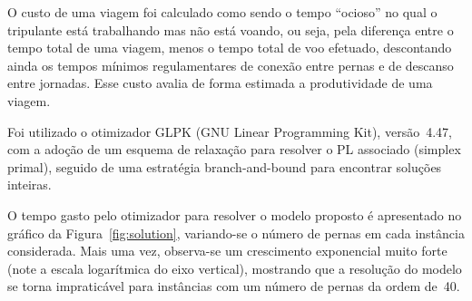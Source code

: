 \documentclass[12pt,a4paper]{article}
\begin{document}
O custo de uma viagem foi calculado como sendo o tempo ``ocioso'' no qual o tripulante está 
trabalhando mas não está voando, ou seja, pela diferença entre o tempo total de uma viagem, menos o 
tempo total de voo efetuado, descontando ainda os tempos mínimos regulamentares de conexão entre 
pernas e de descanso entre jornadas. Esse custo avalia de forma estimada a produtividade de uma 
viagem.

Foi utilizado o otimizador GLPK (GNU Linear Programming Kit), versão~4.47, com a adoção de um 
esquema de relaxação para resolver o PL associado (simplex primal), seguido de uma estratégia 
branch-and-bound para encontrar soluções inteiras.

O tempo gasto pelo otimizador para resolver o modelo proposto é apresentado no gráfico da 
Figura~\ref{fig:solution}, variando-se o número de pernas em cada instância considerada. 
Mais uma vez, observa-se um crescimento exponencial muito forte (note a escala logarítmica do eixo 
vertical), mostrando que a resolução do modelo se torna impraticável para instâncias com um número 
de pernas da ordem de~40.
\end{document}
